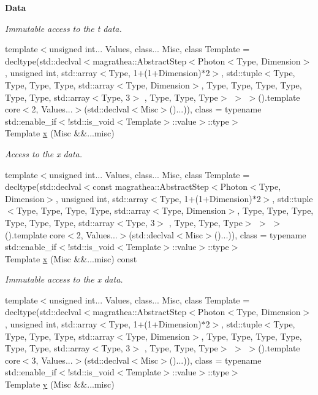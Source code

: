 \begin{Indent}{\bf Data}
\begin{DoxyCompactItemize}
\begin{DoxyCompactList}\small\item\em Immutable access to the t data. \end{DoxyCompactList}\item 
{\footnotesize template$<$unsigned int... Values, class... Misc, class Template  = decltype(std\-::declval$<$magrathea\-::\-Abstract\-Step$<$\-Photon$<$\-Type, Dimension$>$, unsigned int, std\-::array$<$\-Type, 1+(1+\-Dimension)$\ast$2$>$, std\-::tuple$<$\-Type, Type, Type, Type, std\-::array$<$\-Type, Dimension$>$, Type, Type, Type, Type, Type, Type, std\-::array$<$\-Type, 3$>$ , Type, Type, Type$>$ $>$ $>$().\-template core$<$2, Values...$>$(std\-::declval$<$\-Misc$>$()...)), class  = typename std\-::enable\-\_\-if$<$!std\-::is\-\_\-void$<$\-Template$>$\-::value$>$\-::type$>$ }\\Template \hyperlink{exceptionPhoton_a5980c201dd85619c427e25d8880257fd}{x} (Misc \&\&...misc)
\begin{DoxyCompactList}\small\item\em Access to the x data. \end{DoxyCompactList}\item 
{\footnotesize template$<$unsigned int... Values, class... Misc, class Template  = decltype(std\-::declval$<$const magrathea\-::\-Abstract\-Step$<$\-Photon$<$\-Type, Dimension$>$, unsigned int, std\-::array$<$\-Type, 1+(1+\-Dimension)$\ast$2$>$, std\-::tuple$<$\-Type, Type, Type, Type, std\-::array$<$\-Type, Dimension$>$, Type, Type, Type, Type, Type, Type, std\-::array$<$\-Type, 3$>$ , Type, Type, Type$>$ $>$ $>$().\-template core$<$2, Values...$>$(std\-::declval$<$\-Misc$>$()...)), class  = typename std\-::enable\-\_\-if$<$!std\-::is\-\_\-void$<$\-Template$>$\-::value$>$\-::type$>$ }\\Template \hyperlink{exceptionPhoton_a469648c11a2e6837cf0c65fa6fe94635}{x} (Misc \&\&...misc) const 
\begin{DoxyCompactList}\small\item\em Immutable access to the x data. \end{DoxyCompactList}\item 
{\footnotesize template$<$unsigned int... Values, class... Misc, class Template  = decltype(std\-::declval$<$magrathea\-::\-Abstract\-Step$<$\-Photon$<$\-Type, Dimension$>$, unsigned int, std\-::array$<$\-Type, 1+(1+\-Dimension)$\ast$2$>$, std\-::tuple$<$\-Type, Type, Type, Type, std\-::array$<$\-Type, Dimension$>$, Type, Type, Type, Type, Type, Type, std\-::array$<$\-Type, 3$>$ , Type, Type, Type$>$ $>$ $>$().\-template core$<$3, Values...$>$(std\-::declval$<$\-Misc$>$()...)), class  = typename std\-::enable\-\_\-if$<$!std\-::is\-\_\-void$<$\-Template$>$\-::value$>$\-::type$>$ }\\Template \hyperlink{exceptionPhoton_ac536f2da82b01af4de0556ad4006bf99}{y} (Misc \&\&...misc)

\end{DoxyCompactItemize}
\end{Indent}
